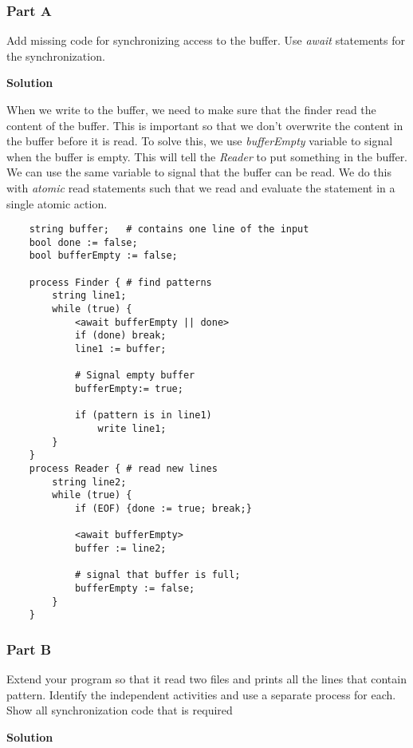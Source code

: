 \subsubsection{Part A}

Add missing code for synchronizing access to the buffer. Use \textit{await} statements for the synchronization. 

\textbf{Solution}

When we write to the buffer, we need to make sure that the finder read the content of the buffer.
This is important so that we don't overwrite the content in the buffer before it is read. To solve this, we use
\textit{bufferEmpty} variable to signal when the buffer is empty. This will tell the \textit{Reader} to put something in the buffer.
We can use the same variable to signal that the buffer can be read. We do this with \textit{atomic} read statements such that we read and evaluate the statement in a single atomic action.  

\begin{lstlisting}
    string buffer;   # contains one line of the input
    bool done := false;
    bool bufferEmpty := false; 

    process Finder { # find patterns
        string line1;
        while (true) {
            <await bufferEmpty || done>
            if (done) break;
            line1 := buffer;

            # Signal empty buffer 
            bufferEmpty:= true;
         
            if (pattern is in line1)
                write line1;
        }
    }
    process Reader { # read new lines
        string line2;
        while (true) {
            if (EOF) {done := true; break;}

            <await bufferEmpty>
            buffer := line2;

            # signal that buffer is full;
            bufferEmpty := false; 
        }
    }
\end{lstlisting}

\subsubsection{Part B}

Extend your program so that it read two files and prints all the lines that contain pattern.
Identify the independent activities and use a separate process for each. 
Show all synchronization code that is required


\textbf{Solution}


